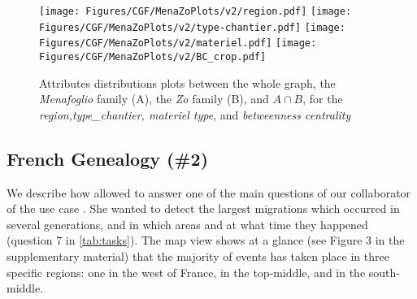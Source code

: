 \begin{figure}
    \centering


    \texttt{[image: Figures/CGF/MenaZoPlots/v2/region.pdf]}
    \texttt{[image: Figures/CGF/MenaZoPlots/v2/type-chantier.pdf]}
    \texttt{[image: Figures/CGF/MenaZoPlots/v2/materiel.pdf]}
    \texttt{[image: Figures/CGF/MenaZoPlots/v2/BC\_crop.pdf]}

    \caption{Attributes distributions plots between the whole graph, the \textit{Menafoglio} family (A), the \textit{Zo} family (B), and $A\cap B$, for the \textit{region,type\_chantier,  materiel type}, and \textit{betweenness centrality}  \label{fig:useCasePascal}}
\end{figure}


\subsection{French Genealogy (\#2)}

We describe how \name allowed to answer one of the main questions of our collaborator of the use case \nicole. She wanted to detect the largest migrations which occurred in several generations, and in which areas and at what time they happened (question 7 in \autoref{tab:tasks}).
The map view shows at a glance (see Figure 3 in the supplementary material) that the majority of events has taken place in three specific regions: one in the west of France, in the top-middle, and in the south-middle.

